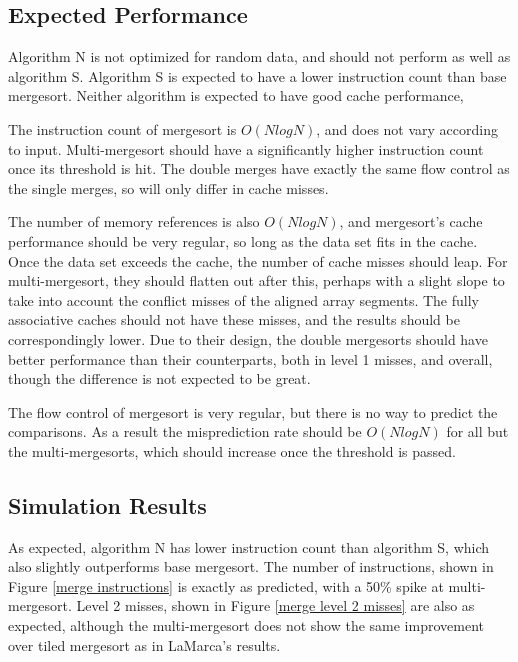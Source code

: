 \subsection{Expected Performance}

Algorithm N is not optimized for random data, and should not perform as well as
algorithm S. Algorithm S is expected to have a lower instruction count than base
mergesort. Neither algorithm is expected to have good cache performance, 

The instruction count of mergesort is $O(NlogN)$, and does not vary
according to input. Multi-mergesort should have a significantly higher
instruction count once its threshold is hit. The double merges have exactly the
same flow control as the single merges, so will only differ in cache misses.

The number of memory references is also $O(NlogN)$, and mergesort's cache
performance should be very regular, so long as the data set fits in the cache. Once
the data set exceeds the cache, the number of cache misses should leap. For
multi-mergesort, they should flatten out after this, perhaps with a slight
slope to take into account the conflict misses of the aligned array segments. The
fully associative caches should not have these misses, and the results should be
correspondingly lower. Due to their design, the double mergesorts should have
better performance than their counterparts, both in level 1 misses, and overall,
though the difference is not expected to be great.

The flow control of mergesort is very regular, but there is no way to predict
the comparisons. As a result the misprediction rate should be $O(NlogN)$ for
all but the multi-mergesorts, which should increase once the threshold is
passed.

\subsection{Simulation Results}
\label{Mergesort results}


As expected, algorithm N has lower instruction count than algorithm S, which
also slightly outperforms base mergesort.  The number of instructions, shown in
Figure \ref{merge instructions} is exactly as predicted, with a 50\% spike at
multi-mergesort. Level 2 misses, shown in Figure \ref{merge level 2 misses} are
also as expected, although the multi-mergesort does not show the same
improvement over tiled mergesort as in LaMarca's results.

